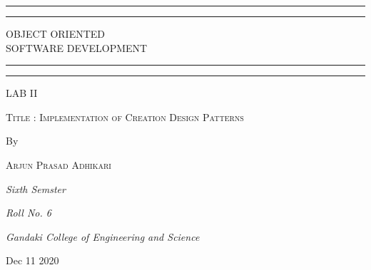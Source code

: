 \begin{titlepage}
\centering %

\scshape %

\vspace*{\baselineskip} %

\rule{\textwidth}{1.6pt}\vspace*{-\baselineskip}\vspace*{2pt} %
\rule{\textwidth}{0.4pt} %

\vspace{0.75\baselineskip} %

{\LARGE OBJECT ORIENTED \\ \vspace{0.75\baselineskip}SOFTWARE DEVELOPMENT} %

\vspace{0.75\baselineskip} %

\rule{\textwidth}{0.4pt}\vspace*{-\baselineskip}\vspace{3.2pt} %
\rule{\textwidth}{1.6pt} %

\vfill

{\LARGE LAB II }

\vspace{0.5\baselineskip} 

{\scshape\Large Title : Implementation of Creation Design Patterns \\} 

\vfill

By

\vspace{0.5\baselineskip} 

{\scshape\Large Arjun Prasad Adhikari \\} 
\vspace{0.5\baselineskip} %

\textit{Sixth Semster} %
\vspace{0.5\baselineskip}

\textit{Roll No. 6} %
\vfill %

\textit{Gandaki College of Engineering and Science} 
\vspace{1\baselineskip}

Dec 11 2020 %


\end{titlepage}
